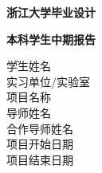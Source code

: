 \thispagestyle{empty}

{
\setlength{\parindent}{0em}
\renewcommand{\baselinestretch}{2}

\vspace*{6.3em}

{
\songti\erhao\bfseries
\centering
浙江大学毕业设计 \par
}

\vspace{0.9em}

{
\songti\yihao\bfseries
\centering
本科学生中期报告 \par
}

\vspace{7em}

{
\renewcommand{\baselinestretch}{1.65}
\songti\sanhao\bfseries
\begin{tabbing} \hspace{1em}
  \=  学生姓名 \hspace{4em} \= \underline{\makebox[16em]{\zjuauthornamec}} \\
  \> 实习单位/实验室 \> \underline{} \\
  \> 项目名称 \> \underline{\makebox[16em]{\zjutitlec}} \\
  \> 导师姓名 \> \underline{\makebox[16em]{\zjumentorc}} \\
  \> 合作导师姓名 \> \underline{\makebox[16em]{}} \\
  \> 项目开始日期 \> \underline{} \\
  \> 项目结束日期 \> \underline{} \par
\end{tabbing}
}
}

